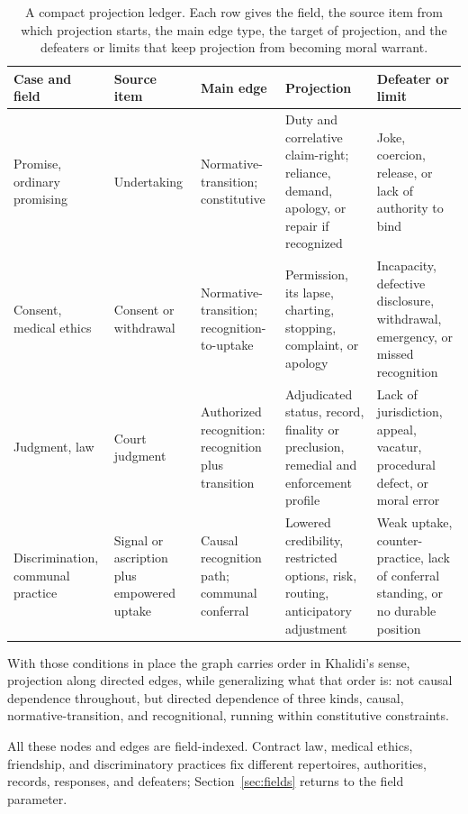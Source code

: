 \documentclass[12pt]{article}
\begin{document}
\begin{table}[H]
\centering
\small
\setlength{\tabcolsep}{3pt}
\begin{tabular}{@{}>{\raggedright\arraybackslash}p{}>{\raggedright\arraybackslash}p{}>{\raggedright\arraybackslash}p{}>{\raggedright\arraybackslash}p{}>{\raggedright\arraybackslash}p{}@{}}
\toprule
Case and field & Source item & Main edge & Projection & Defeater or limit \\
\midrule
Promise, ordinary promising & Undertaking & Normative-transition; constitutive & Duty and correlative claim-right; reliance, demand, apology, or repair if recognized & Joke, coercion, release, or lack of authority to bind \\
Consent, medical ethics & Consent or withdrawal & Normative-transition; recognition-to-uptake & Permission, its lapse, charting, stopping, complaint, or apology & Incapacity, defective disclosure, withdrawal, emergency, or missed recognition \\
Judgment, law & Court judgment & Authorized recognition: recognition plus transition & Adjudicated status, record, finality or preclusion, remedial and enforcement profile \citep{americanLawInstitute1982RestatementJudgments} & Lack of jurisdiction, appeal, vacatur, procedural defect, or moral error \\
Discrimination, communal practice & Signal or ascription plus empowered uptake & Causal recognition path; communal conferral & Lowered credibility, restricted options, risk, routing, anticipatory adjustment & Weak uptake, counter-practice, lack of conferral standing, or no durable position \\
\bottomrule
\end{tabular}
\caption{A compact projection ledger. Each row gives the field, the source item from which projection starts, the main edge type, the target of projection, and the defeaters or limits that keep projection from becoming moral warrant.}
\label{tab:projection-ledger}
\end{table}

With those conditions in place the graph carries order in Khalidi's sense, projection along directed edges, while generalizing what that order is: not causal dependence throughout, but directed dependence of three kinds, causal, normative-transition, and recognitional, running within constitutive constraints.

All these nodes and edges are field-indexed. Contract law, medical ethics, friendship, and discriminatory practices fix different repertoires, authorities, records, responses, and defeaters; Section~\ref{sec:fields} returns to the field parameter.
\end{document}
